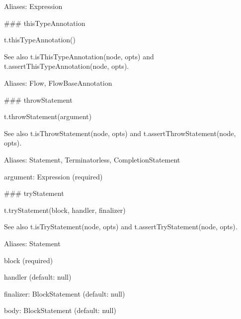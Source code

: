 Aliases\+: {\ttfamily Expression}





\#\#\# this\+Type\+Annotation 
\begin{DoxyCode}
t.thisTypeAnnotation()
\end{DoxyCode}


See also {\ttfamily t.\+is\+This\+Type\+Annotation(node, opts)} and {\ttfamily t.\+assert\+This\+Type\+Annotation(node, opts)}.

Aliases\+: {\ttfamily Flow}, {\ttfamily Flow\+Base\+Annotation}





\#\#\# throw\+Statement 
\begin{DoxyCode}
t.throwStatement(argument)
\end{DoxyCode}


See also {\ttfamily t.\+is\+Throw\+Statement(node, opts)} and {\ttfamily t.\+assert\+Throw\+Statement(node, opts)}.

Aliases\+: {\ttfamily Statement}, {\ttfamily Terminatorless}, {\ttfamily Completion\+Statement}


\begin{DoxyItemize}
\item {\ttfamily argument}\+: {\ttfamily Expression} (required) 


\end{DoxyItemize}

\#\#\# try\+Statement 
\begin{DoxyCode}
t.tryStatement(block, handler, finalizer)
\end{DoxyCode}


See also {\ttfamily t.\+is\+Try\+Statement(node, opts)} and {\ttfamily t.\+assert\+Try\+Statement(node, opts)}.

Aliases\+: {\ttfamily Statement}


\begin{DoxyItemize}
\item {\ttfamily block} (required)
\item {\ttfamily handler} (default\+: {\ttfamily null})
\item {\ttfamily finalizer}\+: {\ttfamily Block\+Statement} (default\+: {\ttfamily null})
\item {\ttfamily body}\+: {\ttfamily Block\+Statement} (default\+: {\ttfamily null}) 


\end{DoxyItemize}

